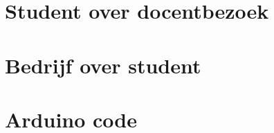 \documentclass{mimosis}
\begin{document}
\begin{appendices}
\appendixpage
\noappendicestocpagenum
\addappheadtotoc
% 
\chapter{Student over docentbezoek}

\chapter{Bedrijf over student}

% 
% 
% 
\chapter{Arduino code}
\label{code} %

\end{appendices}

\backmatter
\end{document}

